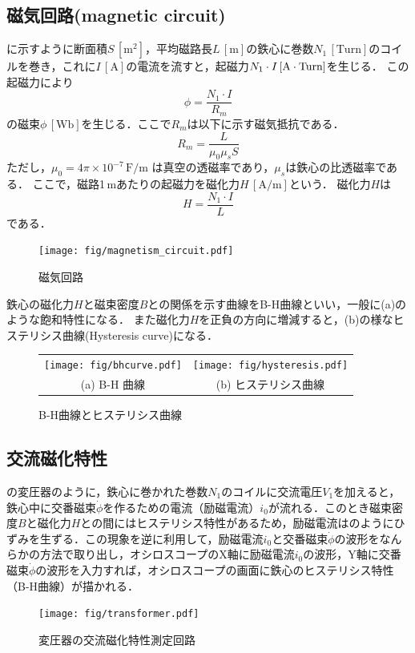 \subsection{磁気回路(magnetic circuit)}
に示すように断面積$S\,[\mathrm{m}^2]$，平均磁路長$L\,[\mathrm{m}]$の鉄心に巻数$N_1\,[\mathrm{Turn}]$のコイルを巻き，これに$I\,[\mathrm{A}]$の電流を流すと，起磁力$N_1\cdot I\,[\mathrm{A}\cdot\rm{Turn}]$を生じる．
この起磁力により
\begin{equation}
	\phi = \frac{N_1\cdot I}{R_m}
\end{equation}
の磁束$\phi\,[\mathrm{Wb}]$を生じる．ここで$R_m$は以下に示す磁気抵抗である．
\begin{equation}
	R_m= \frac{L}{\mu_0 \mu_s S}
\end{equation}
ただし，$\mu_0 = 4\pi\times 10^{-7}\,\mathrm{F/m}$ は真空の透磁率であり，$\mu_s$は鉄心の比透磁率である．
ここで，磁路1\,mあたりの起磁力を磁化力$H\,[\mathrm{A/m}]$という． 磁化力$H$は
\begin{equation}
	H=\frac{N_1\cdot I}{L}
\end{equation}
である．
\begin{figure}[htbp]
	\centering
	\texttt{[image: fig/magnetism\_circuit.pdf]}
	\caption{磁気回路}
	\label{fig:hys:jikikairo}
\end{figure}

鉄心の磁化力$H$と磁束密度$B$との関係を示す曲線をB-H曲線といい，一般に(a)のような飽和特性になる．
また磁化力$H$を正負の方向に増減すると，(b)の様なヒステリシス曲線(Hysteresis curve)になる．
\begin{figure}[htbp]
	\centering
	\begin{tabular}{cc}
		\texttt{[image: fig/bhcurve.pdf]} &
		\texttt{[image: fig/hysteresis.pdf]} \\
		(a) B-H 曲線 & (b) ヒステリシス曲線
	\end{tabular}
	\caption{B-H曲線とヒステリシス曲線}
	\label{fig:hys:bhcurve}
\end{figure}

\subsection{交流磁化特性}
\label{zika}
の変圧器のように，鉄心に巻かれた巻数$N_1$のコイルに交流電圧$V_1$を加えると，鉄心中に交番磁束$\dot{\phi}$を作るための電流（励磁電流）$i_0$が流れる．このとき磁束密度$B$と磁化力$H$との間にはヒステリシス特性があるため，励磁電流はのようにひずみを生ずる．この現象を逆に利用して，励磁電流$i_0$と交番磁束$\dot{\phi}$の波形をなんらかの方法で取り出し，オシロスコープのX軸に励磁電流$i_0$の波形，Y軸に交番磁束$\dot{\phi}$の波形を入力すれば，オシロスコープの画面に鉄心のヒステリシス特性（B-H曲線）が描かれる．
\begin{figure}[htbp]
	\centering
	\texttt{[image: fig/transformer.pdf]}
	\caption{変圧器の交流磁化特性測定回路}
	\label{fig:hys:transformer}
\end{figure}

